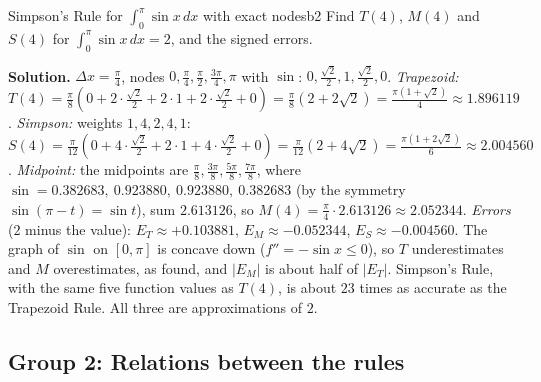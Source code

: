 \documentclass[11pt]{article}
\begin{document}
\begin{exmp}{Simpson's Rule for $\int_0^\pi\sin x\,dx$ with exact nodes}{b2}
Find $T(4)$, $M(4)$ and $S(4)$ for $\int_0^\pi\sin x\,dx=2$, and the signed errors.

\textbf{Solution.} $\Delta x=\frac\pi4$, nodes $0,\frac\pi4,\frac\pi2,\frac{3\pi}4,\pi$ with $\sin$: $0,\frac{\sqrt2}2,1,\frac{\sqrt2}2,0$. \emph{Trapezoid:} $T(4)=\frac{\pi}8\left(0+2\cdot\frac{\sqrt2}2+2\cdot1+2\cdot\frac{\sqrt2}2+0\right)=\frac\pi8\left(2+2\sqrt2\right)=\frac{\pi(1+\sqrt2)}4\approx1.896119$. \emph{Simpson:} weights $1,4,2,4,1$: $S(4)=\frac\pi{12}\left(0+4\cdot\frac{\sqrt2}2+2\cdot1+4\cdot\frac{\sqrt2}2+0\right)=\frac\pi{12}\left(2+4\sqrt2\right)=\frac{\pi(1+2\sqrt2)}6\approx2.004560$. \emph{Midpoint:} the midpoints are $\frac\pi8,\frac{3\pi}8,\frac{5\pi}8,\frac{7\pi}8$, where $\sin=0.382683,\ 0.923880,\ 0.923880,\ 0.382683$ (by the symmetry $\sin(\pi-t)=\sin t$), sum $2.613126$, so $M(4)=\frac\pi4\cdot2.613126\approx2.052344$.
\emph{Errors} ($2$ minus the value): $E_T\approx+0.103881$, $E_M\approx-0.052344$, $E_S\approx-0.004560$. The graph of $\sin$ on $[0,\pi]$ is concave down ($f''=-\sin x\le0$), so $T$ underestimates and $M$ overestimates, as found, and $\lvert E_M\rvert$ is about half of $\lvert E_T\rvert$. Simpson's Rule, with the same five function values as $T(4)$, is about $23$ times as accurate as the Trapezoid Rule. All three are approximations of $2$.
\end{exmp}

\subsection*{Group 2: Relations between the rules}
\end{document}
